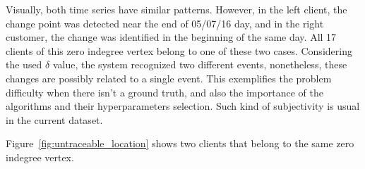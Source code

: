 Visually, both time series have similar patterns.
However, in the left client, the change point was detected near the end of
05/07/16 day, and in the right customer, the change was identified in the
beginning of the same day.
All 17 clients of this zero indegree vertex belong to one of these two cases.
Considering the used $\delta$ value, the system recognized two different
events, nonetheless, these changes are possibly related to a single event.
This exemplifies the problem difficulty when there isn't a ground truth,
and also the importance of the algorithms and their hyperparameters selection.
Such kind of subjectivity is usual in the current dataset.

Figure~\ref{fig:untraceable_location} shows two clients that belong to the same
zero indegree vertex.

\begin{figure}[H]
    \centering
\end{figure}
